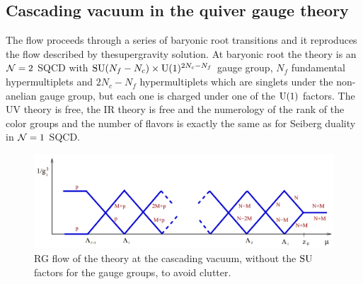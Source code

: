     \subsection{Cascading vacuum in the quiver gauge theory}


    \begin{mybox}
        The flow proceeds through a series of baryonic root transitions and it reproduces  the flow described by thesupergravity solution. At baryonic root the theory is an $\mathcal{N}=2$ SQCD with $\text{SU}(N_f-N_c)\times\text{U}(1)^{2N_c-N_f}$ gauge group, $N_f$ fundamental hypermultiplets and $2N_c-N_f$ hypermultiplets which are singlets under the non-anelian gauge group, but each one is charged under one of the $\text{U}(1)$ factors. The UV theory is free, the IR theory is free and the numerology of the rank of the color groups and the number of flavors is exactly the same as for Seiberg duality in $\mathcal{N}=1$ SQCD.
    \end{mybox}

    \begin{figure}[H]
        \centering
        \includegraphics[scale=0.3]{Pictures/RGflowcascade.png}
        \caption{RG flow of the theory at the cascading vacuum, without the $\text{SU}$ factors for the gauge groups, to avoid clutter.}
    \end{figure}

